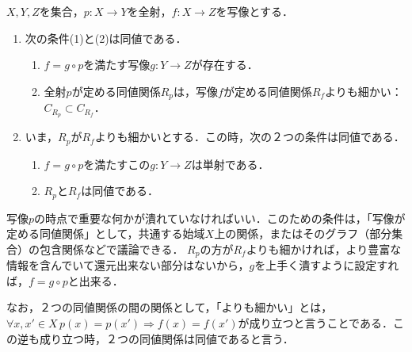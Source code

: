 \documentclass[uplatex,dvipdfmx]{jsreport}
\begin{document}
\begin{proposition}[全射と一般の写像]\label{prop-induced-mapping}
    $X,Y,Z$を集合，$p:X\to Y$を全射，$f:X\to Z$を写像とする．
    \begin{enumerate}
        \item 次の条件(1)と(2)は同値である．
        \begin{enumerate}[(1)]
            \item $f=g\circ p$を満たす写像$g:Y\to Z$が存在する．\begin{center}\end{center}
            \item 全射$p$が定める同値関係$R_p$は，写像$f$が定める同値関係$R_f$よりも細かい：$C_{R_p}\subset C_{R_f}$．
        \end{enumerate}
        \item いま，$R_p$が$R_f$よりも細かいとする．この時，次の２つの条件は同値である．
        \begin{enumerate}[(1)]
            \item $f=g\circ p$を満たすこの$g:Y\to Z$は単射である．
            \item $R_p$と$R_f$は同値である．
        \end{enumerate}
    \end{enumerate}
\end{proposition}
\begin{remark}
    写像$p$の時点で重要な何かが潰れていなければいい．このための条件は，「写像が定める同値関係」として，共通する始域$X$上の関係，またはそのグラフ（部分集合）の包含関係などで議論できる．
    $R_p$の方が$R_f$よりも細かければ，より豊富な情報を含んでいて還元出来ない部分はないから，$g$を上手く潰すように設定すれば，$f=g\circ p$と出来る．

    なお，２つの同値関係の間の関係として，「よりも細かい」とは，$\forall x,x'\in X \, p(x)=p(x')\Rightarrow f(x)=f(x')$が成り立つと言うことである．この逆も成り立つ時，２つの同値関係は同値であると言う．
\end{remark}
\end{document}
